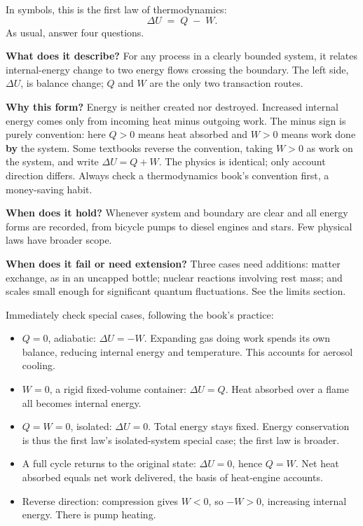 \begin{mainline}
In symbols, this is the first law of thermodynamics:
\[
  \Delta U \;=\; Q \;-\; W .
\]
As usual, answer four questions.

\textbf{What does it describe?} For any process in a clearly bounded system, it relates internal-energy change to two energy flows crossing the boundary. The left side, \(\Delta U\), is balance change; \(Q\) and \(W\) are the only two transaction routes.

\textbf{Why this form?} Energy is neither created nor destroyed. Increased internal energy comes only from incoming heat minus outgoing work. The minus sign is purely convention: here \(Q>0\) means heat absorbed and \(W>0\) means work done \textbf{by} the system. Some textbooks reverse the convention, taking \(W>0\) as work on the system, and write \(\Delta U=Q+W\). The physics is identical; only account direction differs. Always check a thermodynamics book's convention first, a money-saving habit.

\textbf{When does it hold?} Whenever system and boundary are clear and all energy forms are recorded, from bicycle pumps to diesel engines and stars. Few physical laws have broader scope.

\textbf{When does it fail or need extension?} Three cases need additions: matter exchange, as in an uncapped bottle; nuclear reactions involving rest mass; and scales small enough for significant quantum fluctuations. See the limits section.

Immediately check special cases, following the book's practice:

\begin{itemize}
  \item \(Q=0\), adiabatic: \(\Delta U=-W\). Expanding gas doing work spends its own balance, reducing internal energy and temperature. This accounts for aerosol cooling.
  \item \(W=0\), a rigid fixed-volume container: \(\Delta U=Q\). Heat absorbed over a flame all becomes internal energy.
  \item \(Q=W=0\), isolated: \(\Delta U=0\). Total energy stays fixed. Energy conservation is thus the first law's isolated-system special case; the first law is broader.
  \item A full cycle returns to the original state: \(\Delta U=0\), hence \(Q=W\). Net heat absorbed equals net work delivered, the basis of heat-engine accounts.
  \item Reverse direction: compression gives \(W<0\), so \(-W>0\), increasing internal energy. There is pump heating.
\end{itemize}


\end{mainline}
